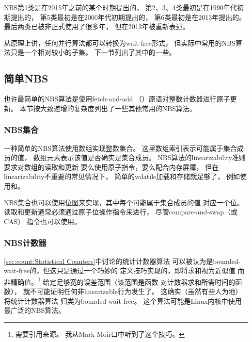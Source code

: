 NBS第1类是在2015年之前的某个时期提出的，
第2、3、4类最初是在1990年代初期提出的，
第5类最初是在2000年代初期提出的，
第6类最初是在2013年提出的。
最后两类已被非正式使用了很多年，
但在2013年被重新表述。

\QuickQuizEnd

从原理上讲，任何并行算法都可以转换为wait-free形式，
但实际中常用的NBS算法只是一个相对较小的子集。
下一节列出了其中的一些。

\subsection{简单NBS}
\label{sec:advsync:Simple NBS}

也许最简单的NBS算法是使用fetch-and-add
（）原语对整数计数器进行原子更新。
本节按大致递增的复杂度列出了一些其他常用的NBS算法。

\subsubsection{NBS集合}
\label{sec:advsync:NBS Sets}

一种简单的NBS算法使用数组实现整数集合。
这里数组索引表示可能属于集合成员的值，
数组元素表示该值是否确实是集合成员。
NBS算法的linearizability准则要求对数组的读取和更新
要么使用原子指令，要么配合内存屏障，
但在linearizability不重要的常见情况下，
简单的volatile加载和存储就足够了，
例如使用和。

NBS集合也可以使用位图来实现，其中每个可能属于集合成员的值
对应一个位。
读取和更新通常必须通过原子位操作指令来进行，
尽管compare-and-swap（或CAS）
指令也可以使用。

\subsubsection{NBS计数器}
\label{sec:advsync:NBS Counters}

\cref{sec:count:Statistical Counters}中讨论的统计计数器算法
可以被认为是bounded-wait-free的，但这只是通过一个巧妙的
定义技巧实现的，即将求和视为近似值
而非精确值。\footnote{
	需要引用来源。
	我从Mark Moir口中听到了这个技巧。}
给定足够宽的误差范围（该范围是函数
对计数器求和所需时间的函数），
就不可能证明任何非linearizable行为发生了。
这确实（虽然有些人为地）将统计计数器算法
归类为bounded wait-free。
这个算法可能是Linux内核中使用最广泛的NBS算法。

